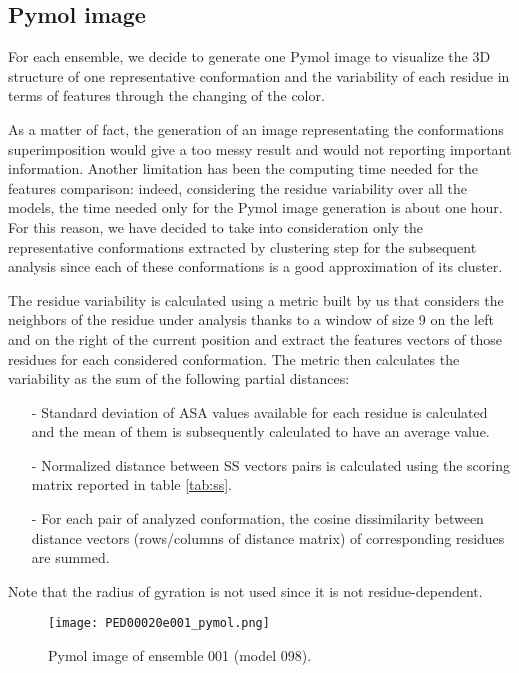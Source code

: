 \subsection{Pymol image}
For each ensemble, we decide to generate one Pymol image to visualize the 3D structure of one representative conformation and the variability of each residue in terms of features through the changing of the color. 

As a matter of fact, the generation of an image representating the conformations superimposition would give a too messy result and would not reporting important information. 
Another limitation has been the computing time needed for the features comparison: indeed, considering the residue variability over all the models, the time needed only for the Pymol image generation is about one hour. For this reason, we have decided to take into consideration only the representative conformations extracted by clustering step for the subsequent analysis since each of these conformations is a good approximation of its cluster.

\medskip
The residue variability is calculated using a metric built by us that considers the neighbors of the residue under analysis thanks to a window of size 9 on the left and on the right of the current position and extract the features vectors of those residues for each considered conformation. 
The metric then calculates the variability as the sum of the following partial distances:
\begin{itemize}
\item[-] Standard deviation of ASA values available for each residue is calculated and the mean of them is subsequently calculated to have an average value.
\item[-] Normalized distance between SS vectors pairs is calculated using the scoring matrix reported in table \ref{tab:ss}.
\item[-] For each pair of analyzed conformation, the cosine dissimilarity between distance vectors (rows/columns of distance matrix) of corresponding residues are summed.
\end{itemize}
Note that the radius of gyration is not used since it is not residue-dependent.

\begin{figure}[H]
    \centering
		\texttt{[image: PED00020e001\_pymol.png]}
		\caption{Pymol image of ensemble 001 (model 098).}
		\label{model001p}
\end{figure}

